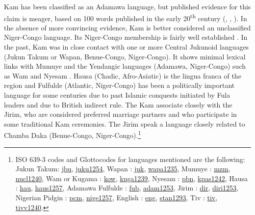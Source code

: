 \documentclass[output=paper,colorlinks,citecolor=brown]{langscibook}
\begin{document}
Kam has been classified as an Adamawa language, but published evidence for this claim is meager, based on 100 words published in the early 20\textsuperscript{th} century (\citealt[547--550]{Meek1931}, \citealt{Greenberg1963}, \citealt{Boyd1989}). In the absence of more convincing evidence, Kam is better considered an unclassified Niger-Congo language. Its Niger-Congo membership is fairly well established \citep{Lesage2019}. In the past, Kam was in close contact with one or more Central Jukunoid languages (Jukun Takum or Wapan, Benue-Congo, Niger-Congo). It shows minimal lexical links with Mumuye and the Yendangic languages (Adamawa, Niger-Congo) such as Wam and Nyesam \citep{Lesage2019}. Hausa (Chadic, Afro-Asiatic) is the lingua franca of the region and Fulfulde (Atlantic, Niger-Congo) has been a politically important language for some centuries due to past Islamic conquests initiated by Fula leaders and due to British indirect rule. The Kam associate closely with the Jirim, who are considered preferred marriage partners and who participate in some traditional Kam ceremonies. The Jirim speak a language closely related to Chamba Daka (Benue-Congo, Niger-Congo).\footnote{ISO 639-3 codes and Glottocodes for languages mentioned are the following: 
    Jukun Takum: \href{https://iso639-3.sil.org/code/jbu}{jbu}, \href{https://glottolog.org/resource/languoid/id/juku1254}{juku1254}, 
    Wapan : \href{https://iso639-3.sil.org/code/juk}{juk}, \href{https://glottolog.org/resource/languoid/id/wapa1235}{wapa1235},
    Mumuye : \href{https://iso639-3.sil.org/code/mzm}{mzm}, \href{https://glottolog.org/resource/languoid/id/nucl1240}{nucl1240}, 
    Wam or Kugama : \href{https://iso639-3.sil.org/code/kow}{kow}, \href{https://glottolog.org/resource/languoid/id/kuga1239}{kuga1239}, 
    Nyesam : \href{https://iso639-3.sil.org/code/pbn}{pbn}, \href{https://glottolog.org/resource/languoid/id/kpas1242}{kpas1242}, 
    Hausa : \href{https://iso639-3.sil.org/code/hau}{hau}, \href{https://glottolog.org/resource/languoid/id/haus1257}{haus1257}, 
    Adamawa Fulfulde : \href{https://iso639-3.sil.org/code/fub}{fub}, \href{https://glottolog.org/resource/languoid/id/adam1253}{adam1253}, 
    Jirim : \href{https://iso639-3.sil.org/code/dir}{dir}, \href{https://glottolog.org/resource/languoid/id/diri1253}{diri1253}, 
    Nigerian Pidgin : \href{https://iso639-3.sil.org/code/pcm}{pcm}, \href{https://glottolog.org/resource/languoid/id/nige1257}{nige1257}, 
    English : \href{https://iso639-3.sil.org/code/eng}{eng}, \href{https://glottolog.org/resource/languoid/id/stan1293}{stan1293}, 
    Tiv : \href{https://iso639-3.sil.org/code/tiv}{tiv}, \href{https://glottolog.org/resource/languoid/id/tivv1240}{tivv1240}.}
\end{document}
